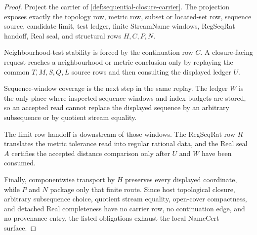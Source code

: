 \begin{proof}
Project the carrier of \autoref{def:sequential-closure-carrier}. The projection exposes exactly the topology row, metric row, subset or located-set row, sequence source, candidate limit, test ledger, finite StreamName windows, RegSeqRat handoff, Real seal, and structural rows $H,C,P,N$.

Neighbourhood-test stability is forced by the continuation row $C$. A closure-facing request reaches a neighbourhood or metric conclusion only by replaying the common $T,M,S,Q,L$ source rows and then consulting the displayed ledger $U$.

Sequence-window coverage is the next step in the same replay. The ledger $W$ is the only place where inspected sequence windows and index budgets are stored, so an accepted read cannot replace the displayed sequence by an arbitrary subsequence or by quotient stream equality.

The limit-row handoff is downstream of those windows. The RegSeqRat row $R$ translates the metric tolerance read into regular rational data, and the Real seal $A$ certifies the accepted distance comparison only after $U$ and $W$ have been consumed.

Finally, componentwise transport by $H$ preserves every displayed coordinate, while $P$ and $N$ package only that finite route. Since host topological closure, arbitrary subsequence choice, quotient stream equality, open-cover compactness, and detached Real completeness have no carrier row, no continuation edge, and no provenance entry, the listed obligations exhaust the local NameCert surface.
\end{proof}

